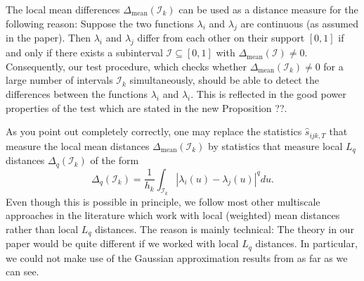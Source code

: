 \documentclass[a4paper,12pt]{article}
\begin{document}
\begin{enumerate}[label=(\arabic*),leftmargin=0.7cm]
The local mean differences $\Delta_{\text{mean}}(\mathcal{I}_k)$ can be used as a distance measure for the following reason: Suppose the two functions $\lambda_i$ and $\lambda_j$ are continuous (as assumed in the paper). Then $\lambda_i$ and $\lambda_j$ differ from each other on their support $[0,1]$ if and only if there exists a subinterval $\mathcal{I} \subseteq [0,1]$ with $\Delta_{\text{mean}}(\mathcal{I}) \ne 0$. 
Consequently, our test procedure, which checks whether $\Delta_{\text{mean}}(\mathcal{I}_k) \ne 0$ for a large number of intervals $\mathcal{I}_k$ simultaneously, should be able to detect the differences between the functions $\lambda_i$ and $\lambda_i$. 
This is reflected in the good power properties of the test which are stated in the new Proposition ??. 


As you point out completely correctly, one may replace the statistics $\hat{s}_{ijk,T}$ that measure the local mean distances $\Delta_{\text{mean}}(\mathcal{I}_k)$ by statistics that measure local $L_q$ distances $\Delta_q(\mathcal{I}_k)$ of the form 
\[ \Delta_q(\mathcal{I}_k) = \frac{1}{h_k} \int_{\mathcal{I}_k} |\lambda_i(u) - \lambda_j(u)|^q du. \]
Even though this is possible in principle, we follow most other multiscale approaches in the literature which work with local (weighted) mean distances rather than local $L_q$ distances. The reason is mainly technical: The theory in our paper would be quite different if we worked with local $L_q$ distances. 
In particular, we could not make use of the Gaussian approximation results from \cite{Chernozhukov2017} as far as we can see. 




\end{enumerate}
\end{document}
